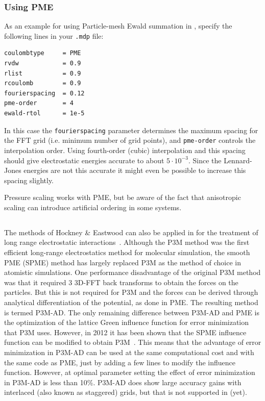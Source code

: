 \subsubsection{Using PME}
As an example for using Particle-mesh Ewald summation in {\gromacs}, specify the
following lines in your {\tt .mdp} file:

\begin{verbatim}
coulombtype     = PME
rvdw            = 0.9
rlist           = 0.9
rcoulomb        = 0.9
fourierspacing  = 0.12
pme-order       = 4
ewald-rtol      = 1e-5
\end{verbatim}

In this case the {\tt fourierspacing} parameter determines the maximum
spacing for the FFT grid (i.e. minimum number of grid points),
and {\tt pme-order} controls the
interpolation order. Using fourth-order (cubic) interpolation and this
spacing should give electrostatic energies accurate to about
$5\cdot10^{-3}$. Since the Lennard-Jones energies are not this
accurate it might even be possible to increase this spacing slightly.

Pressure scaling works with PME, but be aware of the fact that
anisotropic scaling can introduce artificial ordering in some systems.

\subsection{}
\label{sec:pppm}
The  methods of
Hockney \& Eastwood can also be applied in {\gromacs} for the
treatment of long range electrostatic interactions~\cite{Hockney81}.
Although the P3M method was the first efficient long-range electrostatics
method for molecular simulation, the smooth PME (SPME) method has largely
replaced P3M as the method of choice in atomistic simulations. One performance
disadvantage of the original P3M method was that it required 3 3D-FFT
back transforms to obtain the forces on the particles. But this is not
required for P3M and the forces can be derived through analytical differentiation
of the potential, as done in PME. The resulting method is termed P3M-AD.
The only remaining difference between P3M-AD and PME is the optimization
of the lattice Green influence function for error minimization that P3M uses.
However, in 2012 it has been shown that the SPME influence function can be
modified to obtain P3M~\cite{Ballenegger2012}.
This means that the advantage of error minimization in P3M-AD can be used
at the same computational cost and with the same code as PME,
just by adding a few lines to modify the influence function.
However, at optimal parameter setting the effect of error minimization
in P3M-AD is less than 10\%. P3M-AD does show large accuracy gains with
interlaced (also known as staggered) grids, but that is not supported
in {\gromacs} (yet).

